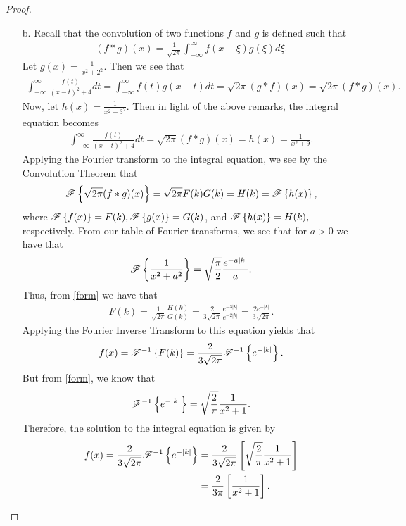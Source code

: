 \begin{proof}
\begin{enumerate}
    \item[b.] Recall that the convolution of two functions $f$ and $g$
      is defined such that
      \begin{align*}
        (f \ast g)(x) = \frac{1}{\sqrt{2\pi}}\int_{-\infty}^\infty f(x-\xi)g(\xi) d\xi.
      \end{align*}
      Let $\displaystyle g(x) = \frac{1}{x^2 + 2^2}$. Then we see that
      \begin{align*}
        \int_{-\infty}^\infty \frac{f(t)}{(x-t)^2 + 4}dt = \int_{-\infty}^\infty f(t) g(x-t)dt
        = \sqrt{2\pi}(g \ast f)(x) = \sqrt{2\pi}(f \ast g)(x).
      \end{align*}
      Now, let $\displaystyle h(x) = \frac{1}{x^2+3^2}$. Then in light of the above remarks, the integral
      equation becomes
      \begin{align*}
        \int_{-\infty}^\infty \frac{f(t)}{(x-t)^2 + 4}dt = \sqrt{2\pi}(f \ast g)(x) = h(x) = \frac{1}{x^2+9}.
      \end{align*}
      Applying the Fourier transform to the integral equation, we see by the Convolution Theorem that
      \begin{align*}
        \mathscr{F}\left\{ {\sqrt{2\pi}(f\ast g)(x)} \right\} = \sqrt{2\pi} F(k)G(k) = H(k) = \mathscr{F}\left\{ {h(x)} \right\},
      \end{align*}
      where $\mathscr{F}\left\{ {f(x)} \right\} = F(k), \mathscr{F}\left\{ {g(x)} \right\} = G(k)$, and $\mathscr{F}\left\{ {h(x)} \right\} = H(k),$ respectively.
      From our table of Fourier transforms, we see
      that for $a>0$ we have that
      \begin{align}\label{form}
        \mathscr{F}\left\{ {\frac{1}{x^2+a^2}} \right\} = \sqrt{\frac{\pi}{2}}\frac{e^{-a|k|}}{a}.
      \end{align}
      Thus, from \eqref{form} we have that
      \begin{align*}
        F(k) = \frac{1}{\sqrt{2\pi}}\frac{H(k)}{G(k)} = \frac{2}{3\sqrt{2\pi}}\frac{e^{-3|k|}}{e^{-2|k|}} = \frac{2e^{-|k|}}{3\sqrt{2\pi}}.
      \end{align*}
      Applying the Fourier Inverse Transform to this equation yields that
      \begin{align*}
        f(x) = \mathscr{F}^{-1}\left\{ {F(k)} \right\}= \frac{2}{3\sqrt{2\pi}} \mathscr{F}^{-1}\left\{ {e^{-|k|}} \right\}.
      \end{align*}
      But from \eqref{form}, we know that
      \begin{align*}
        \mathscr{F}^{-1}\left\{ {e^{-|k|}} \right\}= \sqrt{\frac{2}{\pi}} \frac{1}{x^2+1}.
      \end{align*}
      Therefore, the solution to the integral equation is given by
      \begin{align*}
        f(x) = \frac{2}{3\sqrt{2\pi}} \mathscr{F}^{-1}\left\{ {e^{-|k|}} \right\} &= \frac{2}{3\sqrt{2\pi}} \left[\sqrt{\frac{2}{\pi}} \frac{1}{x^2+1}\right]\\
        &= \frac{2}{3\pi} \left[\frac{1}{x^2+1}\right].
      \end{align*}
  \end{enumerate}
\end{proof}
\newpage
